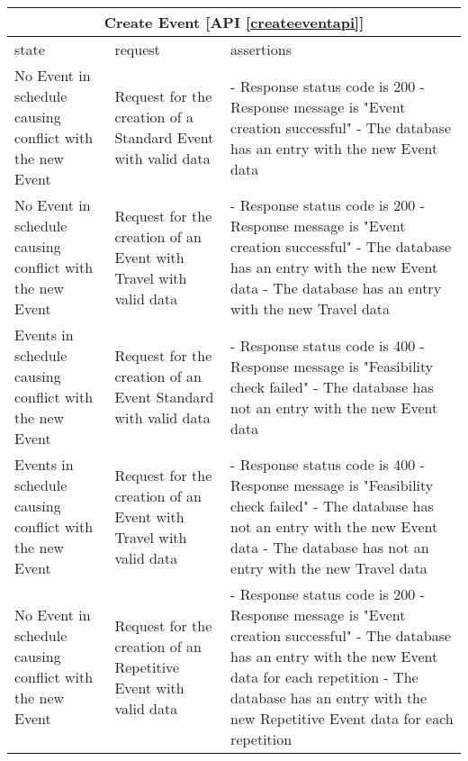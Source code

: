 \begin{center}
	\begin{tabular}{|p{}|p{}|p{}|}
		\hline
		\multicolumn{3}{c}{Create Event [API \ref{createeventapi}]}\\
		
		\hline
		state & request & assertions \\
		
		
		\hline
		No Event in schedule causing conflict with the new Event &
		Request for the creation of a Standard Event with valid data & 
		- Response status code is 200 \newline
		- Response message is "Event creation successful" \newline
		- The database has an entry with the new Event data
		\\
		
		\hline
		No Event in schedule causing conflict with the new Event &
		Request for the creation of an Event with Travel with valid data & 
		- Response status code is 200 \newline
		- Response message is "Event creation successful"\newline
		- The database has an entry with the new Event data \newline
		- The database has an entry with the new Travel data
		\\
		
		\hline
		Events in schedule causing conflict with the new Event &
		Request for the creation of an Event Standard with valid data & 
		- Response status code is 400 \newline
		- Response message is "Feasibility check failed" \newline
		- The database has not an entry with the new Event data
		\\
		
		\hline
		Events in schedule causing conflict with the new Event &
		Request for the creation of an Event with Travel with valid data & 
		- Response status code is 400 \newline
		- Response message is "Feasibility check failed" \newline
		- The database has not an entry with the new Event data \newline
		- The database has not an entry with the new Travel data
		\\
		
		\hline
		No Event in schedule causing conflict with the new Event &
		Request for the creation of an Repetitive Event with valid data & 
		- Response status code is 200 \newline
		- Response message is "Event creation successful" \newline
		- The database has an entry with the new Event data for each repetition \newline
		- The database has an entry with the new Repetitive Event data for each repetition
		\\
	

		\hline
		
	\end{tabular}
\end{center}


